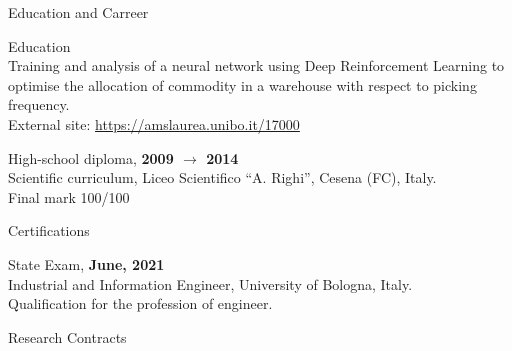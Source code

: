 \documentclass{resume} %
\begin{document}
\begin{rSection}{Education and Carreer}
\begin{rSubsection}{Education}{}{}{}
            \\Training and analysis of a neural network using Deep Reinforcement Learning to optimise the allocation of commodity in a warehouse with respect to picking frequency.
            \\External site: \url{https://amslaurea.unibo.it/17000}
            \item High-school diploma, \textbf{2009 $\rightarrow$ 2014}
            \\Scientific curriculum, Liceo Scientifico ``A. Righi'', Cesena (FC), Italy.
            \\Final mark 100/100
        \end{rSubsection}


        \begin{rSubsection}{Certifications}{}{}{}

            \item State Exam, \textbf{June, 2021}
            \\Industrial and Information Engineer, University of Bologna, Italy.
            \\Qualification for the profession of engineer.

        \end{rSubsection}


        \begin{rSubsection}{Research Contracts}{}{}{}


\end{rSubsection}
\end{rSection}
\end{document}
